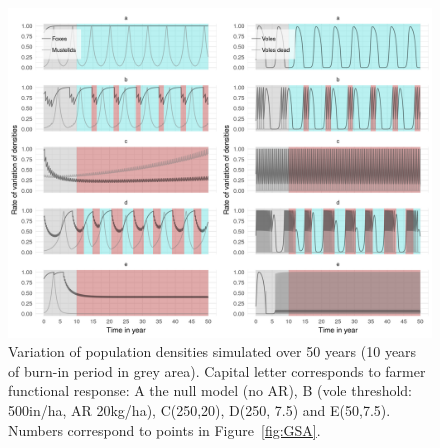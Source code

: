 \documentclass[11pt]{article}
\begin{document}

\begin{figure}
	\begin{center}
		\includegraphics[width=\linewidth]{img/plot_join.png}
		\caption{Variation of population densities simulated over 50 years (10 years of burn-in period in grey area). Capital letter corresponds to farmer functional response: A the null model (no AR), B (vole threshold: 500in/ha, AR 20kg/ha), C(250,20), D(250, 7.5) and E(50,7.5). Numbers correspond to points in Figure~\ref{fig:GSA}.}
		\label{fig:populations}
	\end{center}
\end{figure}

\end{document}

